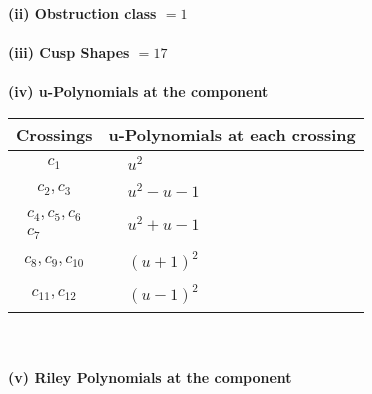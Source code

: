 \documentclass[1p]{elsarticle_modified}
\theoremstyle{definition}
\begin{document}
\flushleft \textbf{(ii) Obstruction class $= 1$}\\~\\
\flushleft \textbf{(iii) Cusp Shapes $= 17$}\\~\\
\newpage\renewcommand{\arraystretch}{1}
\flushleft \textbf{(iv) u-Polynomials at the component}\newline \\
\begin{tabular}{m{50pt}|m{274pt}}
Crossings & \hspace{64pt}u-Polynomials at each crossing \\
\hline $$\begin{aligned}c_{1}\end{aligned}$$&$\begin{aligned}
&u^2
\end{aligned}$\\
\hline $$\begin{aligned}c_{2},c_{3}\end{aligned}$$&$\begin{aligned}
&u^2- u-1
\end{aligned}$\\
\hline $$\begin{aligned}c_{4},c_{5},c_{6}\\c_{7}\end{aligned}$$&$\begin{aligned}
&u^2+u-1
\end{aligned}$\\
\hline $$\begin{aligned}c_{8},c_{9},c_{10}\end{aligned}$$&$\begin{aligned}
&(u+1)^2
\end{aligned}$\\
\hline $$\begin{aligned}c_{11},c_{12}\end{aligned}$$&$\begin{aligned}
&(u-1)^2
\end{aligned}$\\
\hline
\end{tabular}\\~\\
\newpage\renewcommand{\arraystretch}{1}
\flushleft \textbf{(v) Riley Polynomials at the component}\newline \\
\end{document}
